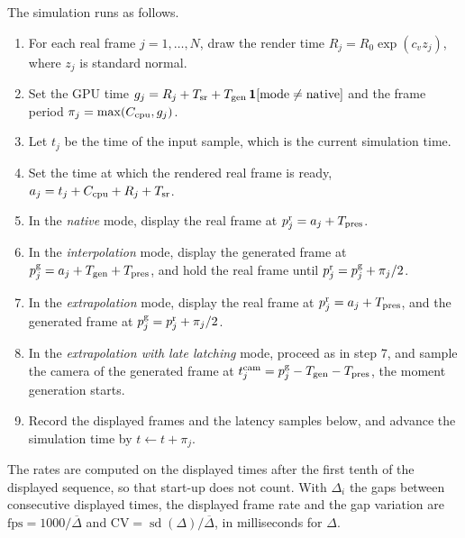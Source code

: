 The simulation runs as follows.
\begin{enumerate}
\item For each real frame $j=1,\dots,N$, draw the render time $R_j=R_0\exp(c_v z_j)$, where $z_j$ is standard normal.
\item Set the GPU time $g_j=R_j+T_{\rm sr}+T_{\rm gen}\,\mathbf 1[\text{mode}\neq\text{native}]$ and the frame period $\pi_j=\max(C_{\rm cpu},g_j)$.
\item Let $t_j$ be the time of the input sample, which is the current simulation time.
\item Set the time at which the rendered real frame is ready, $a_j=t_j+C_{\rm cpu}+R_j+T_{\rm sr}$.
\item In the \emph{native} mode, display the real frame at $p^{\rm r}_j=a_j+T_{\rm pres}$.
\item In the \emph{interpolation} mode, display the generated frame at $p^{\rm g}_j=a_j+T_{\rm gen}+T_{\rm pres}$, and hold the real frame until $p^{\rm r}_j=p^{\rm g}_j+\pi_j/2$.
\item In the \emph{extrapolation} mode, display the real frame at $p^{\rm r}_j=a_j+T_{\rm pres}$, and the generated frame at $p^{\rm g}_j=p^{\rm r}_j+\pi_j/2$.
\item In the \emph{extrapolation with late latching} mode, proceed as in step 7, and sample the camera of the generated frame at $t^{\rm cam}_j=p^{\rm g}_j-T_{\rm gen}-T_{\rm pres}$, the moment generation starts.
\item Record the displayed frames and the latency samples below, and advance the simulation time by $t\leftarrow t+\pi_j$.
\end{enumerate}
The rates are computed on the displayed times after the first tenth of the displayed sequence, so that start-up does not count. With $\Delta_i$ the gaps between consecutive displayed times, the displayed frame rate and the gap variation are $\mathrm{fps}=1000/\overline\Delta$ and $\mathrm{CV}=\operatorname{sd}(\Delta)/\overline\Delta$, in milliseconds for $\Delta$.

